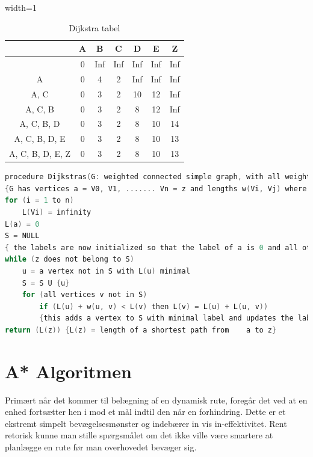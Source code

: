 \begin{table}[ht!]
\centering
\begin{adjustbox}{width=1\textwidth}
\Large
\begin{tabular}{| c | c | c | c | c | c | c |}
	\hline
	 & A & B & C & D & E & Z \\
	\hline
	 & 0 & Inf & Inf & Inf & Inf & Inf \\
	\hline
	{A} & 0 & 4 & 2 & Inf & Inf & Inf \\
	\hline
	{A, C} & 0 & 3 & 2 & 10 & 12 & Inf \\
	\hline
	{A, C, B} & 0 & 3 & 2 & 8 & 12 & Inf \\
	\hline
	{A, C, B, D} & 0 & 3 & 2 & 8 & 10 & 14 \\
	\hline
	{A, C, B, D, E} & 0 & 3 & 2 & 8 & 10 & 13 \\
	\hline
	{A, C, B, D, E, Z} & 0 & 3 & 2 & 8 & 10 & 13 \\
	\hline
\end{tabular}
\end{adjustbox}
\caption{Dijkstra tabel}\label{fig:dijkstratabel}
\end{table}

\begin{lstlisting}[language=C,caption={Dijkstras angivet som eksempel i pseudo-kode},label={lst:DijsktrasPseudo1}]
	procedure Dijkstras(G: weighted connected simple graph, with all weights positive)
{G has vertices a = V0, V1, ....... Vn = z and lengths w(Vi, Vj) where w(Vi,Vj) = infinity if{Vi, Vj} is not an edge in G}
for (i = 1 to n)
	L(Vi) = infinity
L(a) = 0
S = NULL
{ the labels are now initialized so that the label of a is 0 and all other labels are infinity, and S is the empty set }
while (z does not belong to S)
	u = a vertex not in S with L(u) minimal
	S = S U {u}
	for (all vertices v not in S)
		if (L(u) + w(u, v) < L(v) then L(v) = L(u) + L(u, v))
		{this adds a vertex to S with minimal label and updates the labels of vertices not in S}
return (L(z)) {L(z) = length of a shortest path from 	a to z}
\end{lstlisting}

\section{A* Algoritmen}
Primært når det kommer til belægning af en dynamisk rute, foregår det ved at en enhed fortsætter hen i mod et mål indtil den når en forhindring. Dette er et ekstremt simpelt bevægelsesmønster og indebærer in vis in-effektivitet. Rent retorisk kunne man stille spørgsmålet om det ikke ville være smartere at planlægge en rute før man overhovedet bevæger sig.

